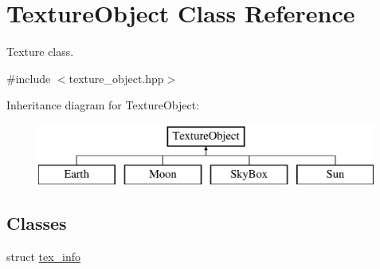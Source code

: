 \hypertarget{classTextureObject}{}\section{Texture\+Object Class Reference}
\label{classTextureObject}


Texture class.  




{\ttfamily \#include $<$texture\+\_\+object.\+hpp$>$}

Inheritance diagram for Texture\+Object\+:\begin{figure}[H]
\begin{center}
\leavevmode
\includegraphics[height=2.000000cm]{classTextureObject}
\end{center}
\end{figure}
\subsection*{Classes}
\begin{DoxyCompactItemize}
\item 
struct \mbox{\hyperlink{structTextureObject_1_1tex__info}{tex\+\_\+info}}
\end{DoxyCompactItemize}
